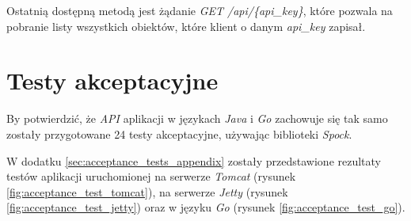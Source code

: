Ostatnią dostępną metodą jest żądanie \textsl{GET /api/\{api\_key\}}, które pozwala na pobranie listy wszystkich obiektów, które klient o danym \textsl{api\_key} zapisał.

\section{Testy akceptacyjne} 

By potwierdzić, że \textsl{API} aplikacji w językach \textsl{Java} i \textsl{Go}  zachowuje się tak samo zostały przygotowane 24 testy akceptacyjne, używając biblioteki \textsl{Spock}. 

W dodatku \ref{sec:acceptance_tests_appendix} zostały  przedstawione rezultaty testów aplikacji uruchomionej na serwerze \textsl{Tomcat} (rysunek \ref{fig:acceptance_test_tomcat}), na serwerze \textsl{Jetty} (rysunek \ref{fig:acceptance_test_jetty}) oraz w języku \textsl{Go} (rysunek \ref{fig:acceptance_test_go}).


